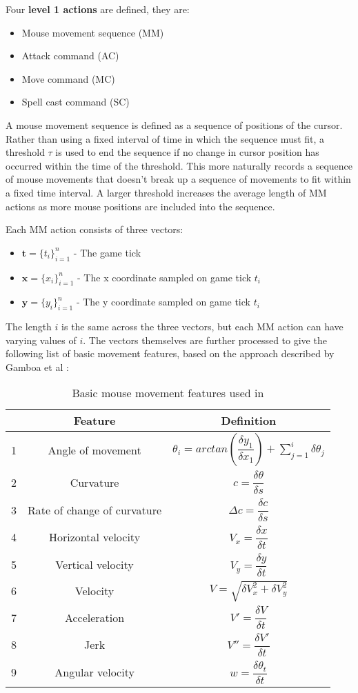 \documentclass[Report.tex]{subfiles}
\begin{document}
Four \textbf{level 1 actions} are defined, they are:
\begin{itemize}
\item Mouse movement sequence (MM)
\item Attack command (AC)
\item Move command (MC)
\item Spell cast command (SC)
\end{itemize}
A mouse movement sequence is defined as a sequence of positions of the cursor. Rather than using a fixed interval of time in which the sequence must fit, a threshold $\tau$ is used to end the sequence if no change in cursor position has occurred within the time of the threshold. This more naturally records a sequence of mouse movements that doesn't break up a sequence of movements to fit within a fixed time interval. A larger threshold increases the average length of MM actions as more mouse positions are included into the sequence. 

Each MM action consists of three vectors:
\begin{itemize}
\item $\boldsymbol{t} = \{t_i\}^{n}_{i=1}$ - The game tick
\item $\boldsymbol{x} = \{x_i\}^{n}_{i=1}$ - The x coordinate sampled on game tick $t_i$
\item $\boldsymbol{y} = \{y_i\}^{n}_{i=1}$ - The y coordinate sampled on game tick $t_i$
\end{itemize}
The length $i$ is the same across the three vectors, but each MM action can have varying values of $i$. The vectors themselves are further processed to give the following list of basic movement features, based on the approach described by Gamboa et al \cite{mouse-features}:
\begin{table}[H]
\renewcommand*{\arraystretch}{2.5}
\centering
\begin{tabular}{| c | c | c |}
\hline
& \textbf{Feature} & \textbf{Definition} \\ \hline
1 & Angle of movement & $\theta_i = arctan(\dfrac{\delta y_1}{\delta x_1}) + \sum\limits_{j=1}^{i} \delta \theta_j$ \\ \hline
2 & Curvature & $c = \dfrac{\delta\theta}{\delta s}$ \\ \hline
3 & Rate of change of curvature & $\Delta c = \dfrac{\delta c}{\delta s}$ \\ \hline
4 & Horizontal velocity & $V_x = \dfrac{\delta x}{\delta t}$ \\ \hline
5 & Vertical velocity & $V_y = \dfrac{\delta y}{\delta t}$ \\ \hline
6 & Velocity & $V = \sqrt{\delta V_{x}^{2} + \delta V_{y}^{2}}$ \\ \hline
7 & Acceleration & $V' = \dfrac{\delta V}{\delta t}$ \\ \hline
8 & Jerk & $V'' = \dfrac{\delta V'}{\delta t}$ \\ \hline
9 & Angular velocity & $w = \dfrac{\delta \theta_t}{\delta t}$ \\ \hline
\end{tabular}
\caption{Basic mouse movement features used in \cite{mouse-features}}
\label{tbl:mm-features}
\end{table}
\end{document}
